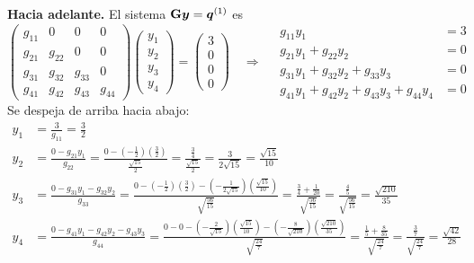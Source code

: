 \textbf{Hacia adelante.} El sistema $\mathbf{G}\bm{y} = \bm{q}^{(1)}$ es
\[
\begin{pmatrix}
	g_{11} & 0 & 0 & 0\\
	g_{21} & g_{22} & 0 & 0\\
	g_{31} & g_{32} & g_{33} & 0\\
	g_{41} & g_{42} & g_{43} & g_{44}
\end{pmatrix}
\begin{pmatrix} y_1\\ y_2\\ y_3\\ y_4 \end{pmatrix}
=
\begin{pmatrix} 3\\ 0\\ 0\\ 0 \end{pmatrix}
\quad\Longrightarrow\quad
\begin{aligned}
	g_{11}y_1 &= 3\\
	g_{21}y_1 + g_{22}y_2 &= 0\\
	g_{31}y_1 + g_{32}y_2 + g_{33}y_3 &= 0\\
	g_{41}y_1 + g_{42}y_2 + g_{43}y_3 + g_{44}y_4 &= 0
\end{aligned}
\]
Se despeja de arriba hacia abajo:
\begin{align*}
	y_1 &= \frac{3}{g_{11}} = \frac32\\[8pt]
	y_2 &= \frac{0 - g_{21}y_1}{g_{22}}
	= \frac{0 - \left(-\tfrac12\right)\left(\tfrac32\right)}{\tfrac{\sqrt{15}}{2}}
	= \frac{\tfrac34}{\tfrac{\sqrt{15}}{2}} = \frac{3}{2\sqrt{15}} = \frac{\sqrt{15}}{10}\\[8pt]
	y_3 &= \frac{0 - g_{31}y_1 - g_{32}y_2}{g_{33}}
	= \frac{0 - \left(-\tfrac12\right)\left(\tfrac32\right) - \left(-\tfrac{1}{2\sqrt{15}}\right)\left(\tfrac{\sqrt{15}}{10}\right)}{\sqrt{\tfrac{56}{15}}}
	= \frac{\tfrac34 + \tfrac{1}{20}}{\sqrt{\tfrac{56}{15}}}
	= \frac{\tfrac45}{\sqrt{\tfrac{56}{15}}} = \frac{\sqrt{210}}{35}\\[8pt]
	y_4 &= \frac{0 - g_{41}y_1 - g_{42}y_2 - g_{43}y_3}{g_{44}}
	= \frac{0 - 0 - \left(-\tfrac{2}{\sqrt{15}}\right)\left(\tfrac{\sqrt{15}}{10}\right) - \left(-\tfrac{8}{\sqrt{210}}\right)\left(\tfrac{\sqrt{210}}{35}\right)}{\sqrt{\tfrac{24}{7}}}
	= \frac{\tfrac15 + \tfrac{8}{35}}{\sqrt{\tfrac{24}{7}}}
	= \frac{\tfrac37}{\sqrt{\tfrac{24}{7}}} = \frac{\sqrt{42}}{28}
\end{align*}

